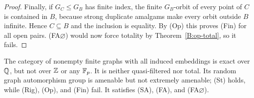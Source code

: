 \begin{proof}
Finally, if $G_C\leq G_B$ has finite index, the finite
$G_B$-orbit of every point of $C$ is contained in $B$,
because strong duplicate amalgams make every orbit outside
$B$ infinite. Hence $C\subseteq B$ and the inclusion is
equality. By (Op) this proves (Fin) for all open pairs.
(FA$\varnothing$) would now force totality by
Theorem~\ref{B:op-total}, so it fails.
\end{proof}

\begin{proposition}
\label{A:graphs}
The category of nonempty finite graphs with all induced
embeddings is exact over $\mathbb Q$, but not over $\mathbb Z$ or any
$\mathbb F_p$. It is neither quasi-filtered nor total. Its random
graph automorphism group is amenable but not extremely
amenable; (St) holds, while (Rig), (Op), and (Fin) fail.
It satisfies (SA), (FA), and (FA$\varnothing$).
\end{proposition}
